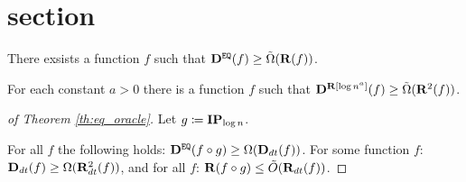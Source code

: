 \section{section}

\begin{theorem}
    \label{th:eq_oracle}
    There exsists a function $f$ such that $\mathbf{D}^{\mathtt{EQ}}(f) \ge \tilde{\Omega}(\mathbf{R}(f))$.
\end{theorem}

\begin{theorem}
    For each constant $a > 0$ there is a function $f$ such that $\mathbf{D}^{\mathbf{R}[\log n^a]}(f) \ge
    \tilde{\Omega}(\mathbf{R}^2(f))$.
\end{theorem}


\begin{proof}[of Theorem \ref{th:eq_oracle}]
    Let $g \coloneqq \mathbf{IP}_{\log n}$.

    For all $f$ the following holds: $\mathbf{D}^{\mathtt{EQ}}(f \circ g) \ge \Omega(\mathbf{D}_{dt}(f))$. For some function $f$:
    $\mathbf{D}_{dt}(f) \ge \Omega(\mathbf{R}_{dt}^2(f))$, and for all $f$: $\mathbf{R}(f \circ g) \le \tilde{O}(\mathbf{R}_{dt}(f))$.
\end{proof}
